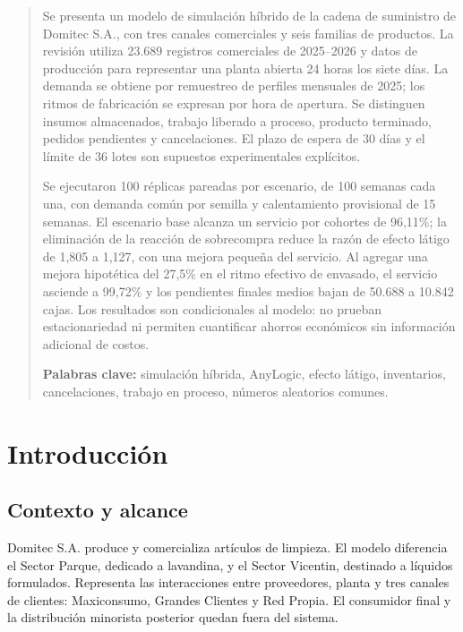 \documentclass[11pt, a4paper]{article}
\renewenvironment{abstract}{%
    \begin{center}{\bfseries\large\color{azulUTN}\abstractname}\end{center}\vspace{-0.3em}
    \begin{quote}\small\setlength{\parindent}{0pt}\setlength{\parskip}{0.5em}\selectfont}%
    {\end{quote}}
\newcommand{\FillBase}{96,11}
\newcommand{\FillIntegral}{99,72}
\newcommand{\BWBase}{1,805}
\newcommand{\BWSinPanico}{1,127}
\newcommand{\BacklogBase}{50.688}
\newcommand{\BacklogIntegral}{10.842}
\begin{document}
\begin{abstract}
Se presenta un modelo de simulación híbrido de la cadena de suministro de Domitec S.A., con tres canales comerciales y seis familias de productos. La revisión utiliza 23.689 registros comerciales de 2025--2026 y datos de producción para representar una planta abierta 24 horas los siete días. La demanda se obtiene por remuestreo de perfiles mensuales de 2025; los ritmos de fabricación se expresan por hora de apertura. Se distinguen insumos almacenados, trabajo liberado a proceso, producto terminado, pedidos pendientes y cancelaciones. El plazo de espera de 30 días y el límite de 36 lotes son supuestos experimentales explícitos.

Se ejecutaron 100 réplicas pareadas por escenario, de 100 semanas cada una, con demanda común por semilla y calentamiento provisional de 15 semanas. El escenario base alcanza un servicio por cohortes de \FillBase\%; la eliminación de la reacción de sobrecompra reduce la razón de efecto látigo de \BWBase{} a \BWSinPanico{}, con una mejora pequeña del servicio. Al agregar una mejora hipotética del 27,5\% en el ritmo efectivo de envasado, el servicio asciende a \FillIntegral\% y los pendientes finales medios bajan de \BacklogBase{} a \BacklogIntegral{} cajas. Los resultados son condicionales al modelo: no prueban estacionariedad ni permiten cuantificar ahorros económicos sin información adicional de costos.

\medskip
\noindent\textbf{Palabras clave:} simulación híbrida, AnyLogic, efecto látigo, inventarios, cancelaciones, trabajo en proceso, números aleatorios comunes.
\end{abstract}

\section{Introducción}
\subsection{Contexto y alcance}
Domitec S.A. produce y comercializa artículos de limpieza. El modelo diferencia el Sector Parque, dedicado a lavandina, y el Sector Vicentin, destinado a líquidos formulados. Representa las interacciones entre proveedores, planta y tres canales de clientes: Maxiconsumo, Grandes Clientes y Red Propia. El consumidor final y la distribución minorista posterior quedan fuera del sistema.
\end{document}
